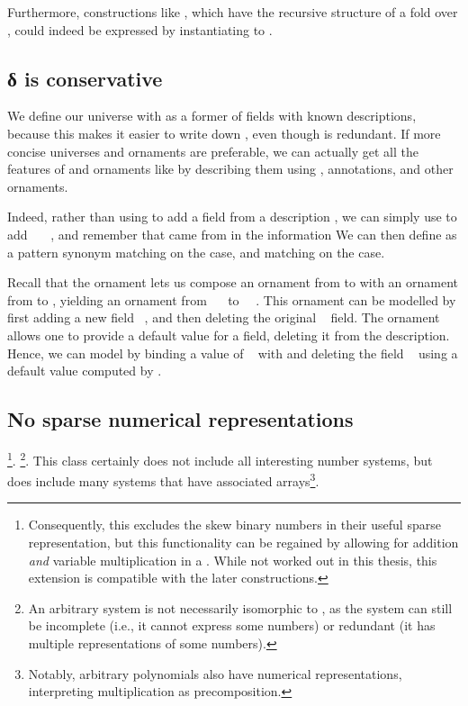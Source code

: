 Furthermore, constructions like , which have the recursive structure of a fold over , could indeed be expressed by instantiating  to .


\subsection{δ is conservative}\label{sec:redundant-delta}
We define our universe  with  as a former of fields with known descriptions, because this makes it easier to write down , even though  is redundant. If more concise universes and ornaments are preferable, we can actually get all the features of  and ornaments like  by describing them using , annotations, and other ornaments.

Indeed, rather than using  to add a field from a description , we can simply use  to add \ \AV{=}\ \ , and remember that  came from  in the information
We can then define  as a pattern synonym matching on the  case, and  matching on the  case.

Recall that the ornament  lets us compose an ornament from  to  with an ornament from  to , yielding an ornament from \ \  to \ \ . This ornament can be modelled by first adding a new field \ , and then deleting the original \  field. The ornament  \cite{kophd} allows one to provide a default value for a field, deleting it from the description. Hence, we can model  by binding a value  of \  with  and deleting the field \  using a default value computed by .


\subsection{No sparse numerical representations}\label{sec:discussion-no-sparse}
\begin{outline}
\footnote{Consequently, this excludes the skew binary numbers \cite{oka95b} in their useful sparse representation, but this functionality can be regained by allowing for addition \emph{and} variable multiplication in a . While not worked out in this thesis, this extension is compatible with the later constructions.}.
\footnote{An arbitrary  system is not necessarily isomorphic to \bN{}, as the system can still be incomplete (i.e., it cannot express some numbers) or redundant (it has multiple representations of some numbers).}. This class certainly does not include all interesting number systems, but does include many systems that have associated arrays\footnote{Notably, arbitrary polynomials also have numerical representations, interpreting multiplication as precomposition.}. 
\end{outline}
    



